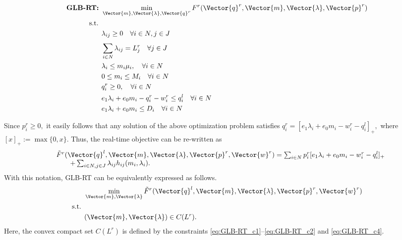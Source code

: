 \vspace{0.1in}
\begin{subequations}
	\begin{align}
	\text{\bf{GLB-RT}: } &  \min_{\Vector{m}, \Vector{\lambda}, \Vector{q}^r} F^r(\Vector{q}^r, \Vector{m},\Vector{\lambda},\Vector{p}^r) \nonumber \\
	\mbox{s.t. } \nonumber \\
	\label{eq:GLB-RT_c1}
	&\lambda_{ij} \geq 0  \quad \forall i \in N,j \in J \\
	&\sum_{i\in N}^{} \lambda_{ij} = L^r_j \quad \forall j \in J \\
	\label{eq:GLB-RT_c}
	&\lambda_i \leq m_i \mu_i,   \quad \forall i \in N\\
	&0 \leq m_i \leq M_i \quad \forall i \in N \\
	\label{eq:GLB-RT_c2}
	&q^r_i \geq 0, \quad \forall i \in N \\
	\label{eq:GLB-RT_c3}
	& e_1\lambda_i +e_0m_i - q^r_i - w^r_i \leq q^l_i \quad \forall i \in N \\
	\label{eq:GLB-RT_c4}
	&e_1\lambda_i +e_0m_i \leq D_i \quad \forall i \in N
	\end{align}
\end{subequations}
\vspace{0.1in}

Since $p^r_i \geq 0,$ it easily follows that any solution of the above optimization problem satisfies $q^r_i =[e_1\lambda_i +e_0m_i- w^r_i - q^l_i]_+,$ where $[x]_+ := \max\{0,x\}.$ Thus, the real-time objective can be re-written as 
\begin{equation}
\label{eq:rt-obj2}
\begin{array}{rl}
&\tilde{F}^r(\Vector{q}^l,\Vector{m},\Vector{\lambda},\Vector{p}^r,\Vector{w}^r) = \sum_{i \in N} p^r_i [e_1\lambda_i +e_0m_i - w^r_i - q^l_i]_+ \\
& \qquad+ \sum_{i\in N, j \in J}
\lambda_{ij}h_{ij}(m_i,\lambda_i).    
\end{array}
\end{equation}
With this notation, GLB-RT can be equivalently expressed as follows.
\begin{subequations}
	\begin{align*}
	& \min_{\Vector{m}, \Vector{\lambda}} \tilde{F}^r(\Vector{q}^l,\Vector{m},\Vector{\lambda},\Vector{p}^r,\Vector{w}^r) \\
	\mbox{s.t. } \nonumber \\
	&(\Vector{m},\Vector{\lambda}) \in C(L^r).
	\end{align*}
\end{subequations}
Here, the convex compact set $C(L^r)$ is defined by the constraints
\eqref{eq:GLB-RT_c1}--\eqref{eq:GLB-RT_c2} and {\eqref{eq:GLB-RT_c4}}.



